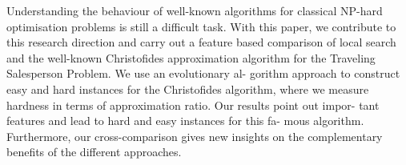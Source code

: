 \documentclass{article}
\begin{document}
{\cite{Nallaperuma2013christofides}
Understanding the behaviour of well-known algorithms for classical NP-hard optimisation problems is still a difficult task. With this paper, we contribute to this research direction and carry out a feature based comparison of local search and the well-known Christofides approximation algorithm for the Traveling Salesperson Problem. We use an evolutionary al- gorithm approach to construct easy and hard instances for the Christofides algorithm, where we measure hardness in terms of approximation ratio. Our results point out impor- tant features and lead to hard and easy instances for this fa- mous algorithm. Furthermore, our cross-comparison gives new insights on the complementary benefits of the different approaches.



}
\end{document}
